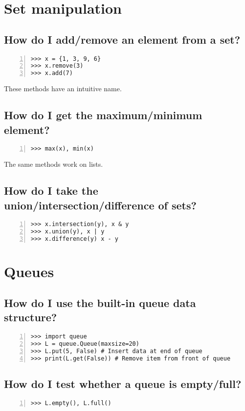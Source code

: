 \documentclass[12pt]{article}
\begin{document}
\section{Set manipulation}
\subsection{How do I add/remove an element from a set?}
\begin{lstlisting}[numbers=left]
>>> x = {1, 3, 9, 6}
>>> x.remove(3)
>>> x.add(7)
\end{lstlisting}
These methods have an intuitive name.

\subsection{How do I get the maximum/minimum element?}
\begin{lstlisting}[numbers=left]
>>> max(x), min(x)
\end{lstlisting}
The same methods work on lists.

\subsection{How do I take the union/intersection/difference of sets?}
\begin{lstlisting}[numbers=left]
>>> x.intersection(y), x & y
>>> x.union(y), x | y
>>> x.difference(y) x - y
\end{lstlisting}

\section{Queues}
\subsection{How do I use the built-in queue data structure?}
\begin{lstlisting}[numbers=left]
>>> import queue
>>> L = queue.Queue(maxsize=20)
>>> L.put(5, False) # Insert data at end of queue
>>> print(L.get(False)) # Remove item from front of queue
\end{lstlisting}

\subsection{How do I test whether a queue is empty/full?}
\begin{lstlisting}[numbers=left]
>>> L.empty(), L.full()
\end{lstlisting}
  
\end{document}
